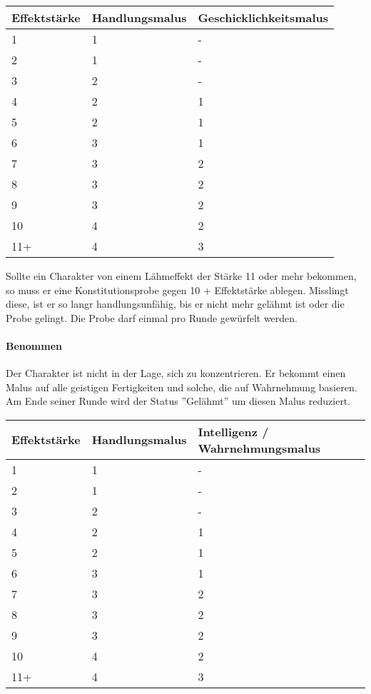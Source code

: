 \documentclass{article}
\begin{document}
\begin{small}
\begin{tabular}{|m{2cm}|m{3cm}|m{6cm}|}
\hline
\textbf{Effektstärke}&\textbf{Handlungsmalus}&\textbf{Geschicklichkeitsmalus}\\
\hline
\hline
1&1&-\\
\hline
2&1&-\\
\hline
3&2&-\\
\hline
4&2&1\\
\hline
5&2&1\\
\hline
6&3&1\\
\hline
7&3&2\\
\hline
8&3&2\\
\hline
9&3&2\\
\hline
10&4&2\\
\hline
11+&4&3\\
\hline
\end{tabular}
\end{small}

Sollte ein Charakter von einem Lähmeffekt der Stärke 11 oder mehr bekommen, so muss er eine Konstitutionsprobe gegen
10 + Effektstärke ablegen. Misslingt diese, ist er so langr handlungsunfähig, bis er nicht mehr gelähmt ist oder die Probe
gelingt. Die Probe darf einmal pro Runde gewürfelt werden.

\paragraph{Benommen}

Der Charakter ist nicht in der Lage, sich zu konzentrieren. Er bekommt einen Malus auf alle geistigen Fertigkeiten und
solche, die auf Wahrnehmung basieren. Am Ende seiner Runde wird der Status ''Gelähmt'' um diesen Malus reduziert.


\begin{small}
\begin{tabular}{|m{2cm}|m{3cm}|m{6cm}|}
\hline
\textbf{Effektstärke}&\textbf{Handlungsmalus}&\textbf{Intelligenz / Wahrnehmungsmalus}\\
\hline
\hline
1&1&-\\
\hline
2&1&-\\
\hline
3&2&-\\
\hline
4&2&1\\
\hline
5&2&1\\
\hline
6&3&1\\
\hline
7&3&2\\
\hline
8&3&2\\
\hline
9&3&2\\
\hline
10&4&2&\\
\hline
11+&4&3\\
\hline
\end{tabular}
\end{small}
\end{document}
